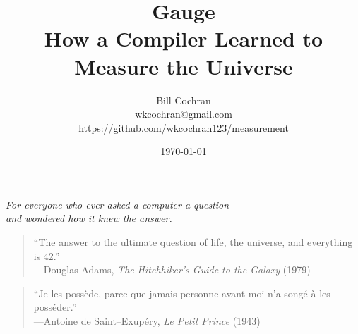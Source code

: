 \documentclass[12pt,oneside]{book}
\begin{document}
\title{Gauge\\
\large How a Compiler Learned to Measure the Universe}

\author{Bill Cochran\\wkcochran@gmail.com\\https://github.com/wkcochran123/measurement}
\date{\today}

\maketitle

\begin{center}
\vspace*{2em}
\begin{center}
\vspace*{2em}
\vspace*{2em}
\textit{For everyone who ever asked a computer a question \\
and wondered how it knew the answer.}
\vspace*{6em}
\begin{quote}
``The answer to the ultimate question of life, the universe, and everything is 42.''\\
\hfill---Douglas Adams, \textit{The Hitchhiker's Guide to the Galaxy} (1979)
\end{quote}
\vspace*{2em}
\begin{quote}
``Je les poss\`ede, parce que jamais personne avant moi n'a song\'e \`a les poss\'eder.''\\
\hfill---Antoine de Saint--Exup\'ery, \textit{Le Petit Prince} (1943)
\end{quote}
\end{center}
\vspace*{2em}
\end{center}

\newpage
\frontmatter
\onehalfspacing



\tableofcontents

\mainmatter









\cleardoublepage

\backmatter



\end{document}
